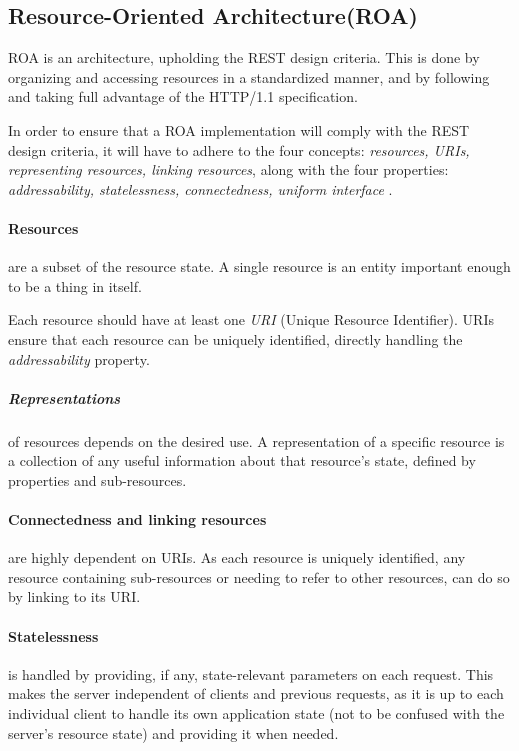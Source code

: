 \subsection{Resource-Oriented Architecture(ROA)}\label{webservice:roa}
ROA is an architecture, upholding the REST design criteria.
This is done by organizing and accessing resources in a standardized manner, and by following and taking full advantage of the HTTP/1.1 specification.

In order to ensure that a ROA implementation will comply with the REST design criteria, it will have to adhere to the four concepts: \textit{resources, URIs, representing resources, linking resources}, along with the four properties: \textit{addressability, statelessness, connectedness, uniform interface} \cite[Chapter 4]{restful_web_services}.

\paragraph{Resources} are a subset of the resource state.
A single resource is an entity important enough to be a thing in itself.

Each resource should have at least one \textit{URI} (Unique Resource Identifier).
URIs ensure that each resource can be uniquely identified, directly handling the \textit{addressability} property.

\subparagraph{Representations} of resources depends on the desired use.
A representation of a specific resource is a collection of any useful information about that resource's state, defined by properties and sub-resources.

\paragraph{Connectedness and linking resources} are highly dependent on URIs.
As each resource is uniquely identified, any resource containing sub-resources or needing to refer to other resources, can do so by linking to its URI. 

\paragraph{Statelessness} is handled by providing, if any, state-relevant parameters on each request.
This makes the server independent of clients and previous requests, as it is up to each individual client to handle its own application state (not to be confused with the server's resource state) and providing it when needed.

